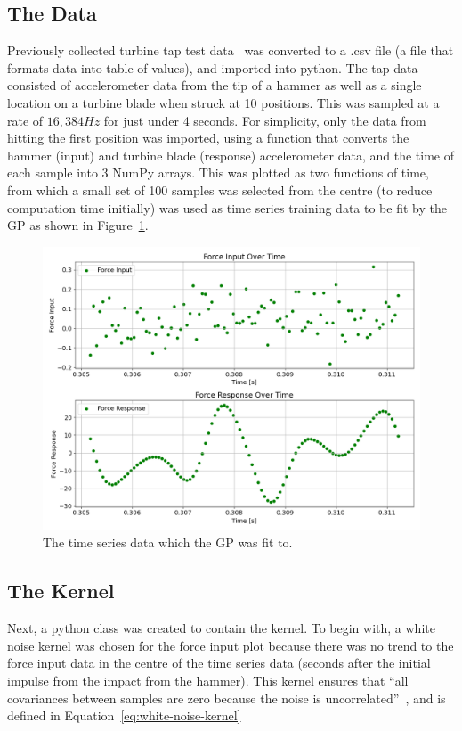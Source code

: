 \documentclass[12pt]{article}
\begin{document}
    \subsection{The Data}
    Previously collected turbine tap test data~\cite{MEC326} was converted to a .csv file (a file that formats data into table of values), and imported into python.
    The tap data consisted of accelerometer data from the tip of a hammer as well as a single location on a turbine blade when struck at 10 positions.
    This was sampled at a rate of $16,384 Hz$ for just under 4 seconds.
    For simplicity, only the data from hitting the first position was imported, using a function that converts the hammer (input) and turbine blade (response) accelerometer data, and the time of each sample into 3 NumPy arrays.
    This was plotted as two functions of time, from which a small set of 100 samples was selected from the centre (to reduce computation time initially) was used as time series training data to be fit by the GP as shown in Figure~\ref{fig:input-response-plot}.

    \begin{figure}[ht]
        \centering
        \includegraphics[width=1.0\linewidth]{figures/input-response-plot/input-response-plot.png}
        \caption{The time series data which the GP was fit to.}
        \label{fig:input-response-plot}
    \end{figure}



    \subsection{The Kernel}
    Next, a python class was created to contain the kernel.
    To begin with, a white noise kernel was chosen for the force input plot because there was no trend to the force input data in the centre of the time series data (seconds after the initial impulse from the impact from the hammer).
    This kernel ensures that ``all covariances between samples are zero because the noise is uncorrelated''~\cite{RoelantsGPKernels}, and is defined in Equation~\ref{eq:white-noise-kernel}
\end{document}
